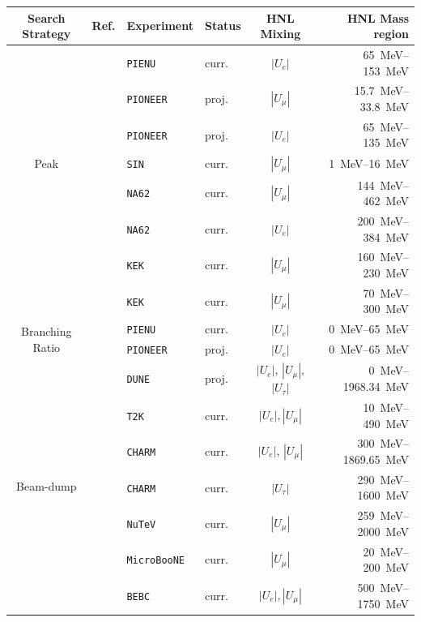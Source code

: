 \begin{table}[h!t]
\centering
\begin{tabular}{|c|lll|cr|}
\hline
Search Strategy & Ref. & Experiment &  Status & HNL Mixing  & HNL Mass region   \\
 \hline
\multirow{7}{*}{Peak} & \cite{PIENU:2017wbj}& \texttt{PIENU} & curr. & $|U_e|$ &  \SIrange{65}{153}{\MeV} \\ 
&\cite{PIONEER:2022alm} & \texttt{PIONEER} & proj. &  $|U_\mu|$& \SIrange{15.7}{33.8}{\MeV} \\
& \cite{PIONEER:2022alm} & \texttt{PIONEER} & proj. & $|U_e|$ & \SIrange{65}{135}{\MeV} \\
&\cite{Daum:1987bg} & \texttt{SIN} & curr. & $|U_\mu|$ & \SIrange{1}{16}{\MeV}\\
&\cite{NA62:2020mcv} & \texttt{NA62} & curr.   & $|U_\mu|$ & \SIrange{144}{462}{\MeV}\\
&\cite{NA62:2021bji} & \texttt{NA62} & curr.  & $|U_e|$ & \SIrange{200}{384}{\MeV}\\
&\cite{Asano:1981he}& \texttt{KEK} & curr.   & $|U_\mu|$ & \SIrange{160}{230}{\MeV} \\
&\cite{Hayano:1982wu} & \texttt{KEK} & curr.   & $|U_\mu|$ & \SIrange{70}{300}{\MeV}\\
\hline
\multirow{2}{*}{Branching Ratio} &\cite{PIENU:2017wbj} & \texttt{PIENU} &  curr. &$|U_e|$ &  \SIrange{0}{65}{\MeV} \\ 
& \cite{PIONEER:2022alm} & \texttt{PIONEER} & proj.  & $|U_e|$ & \SIrange{0}{65}{\MeV} \\
\hline
\multirow{9}{*}{Beam-dump} & \cite{Ballett:2019bgd} & \texttt{DUNE} & proj. &  $|U_e|$, $|U_\mu|$, $|U_\tau|$ & \SIrange{0}{1968.34}{\MeV} \\
& \cite{T2K:2019jwa} & \texttt{T2K} & curr. &   $|U_e|, |U_\mu|$ & \SIrange{10}{490}{\MeV} \\
& \cite{CHARM:1985nku,CHARMII:1994jjr} & \texttt{CHARM} & curr. &  $|U_e|$, $|U_\mu|$ & \SIrange{300}{1869.65}{\MeV} \\
& \cite{Orloff:2002de} & \texttt{CHARM} & curr. &  $|U_\tau|$ & \SIrange{290}{1600}{\MeV} \\
& \cite{NuTeV:1999kej} & \texttt{NuTeV} & curr. &  $|U_\mu|$ & \SIrange{259}{2000}{\MeV} \\
& \cite{Kelly:2021xbv} & \texttt{MicroBooNE} & curr. &  $|U_\mu|$ & \SIrange{20}{200}{\MeV}\\
& \cite{WA66:1985mfx} & \texttt{BEBC} & curr. &  $|U_e|, |U_\mu|$ & \SIrange{500}{1750}{\MeV}\\

\end{tabular}
\end{table}
